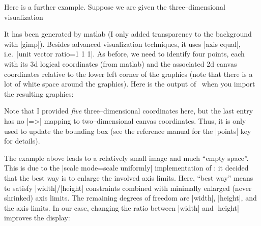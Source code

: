 {{Here is a further example. Suppose we are given the three--dimensional visualization

{\setlength{\fboxsep}{0pt}%
\centering
{}%

}%

It has been generated by matlab (I only added transparency to the background with |gimp|). Besides advanced visualization techniques, it uses |axis equal|, i.e.\ |unit vector ratio=1 1 1|. As before, we need to identify four points, each with its 3d logical coordinates (from matlab) and the associated 2d canvas coordinates relative to the lower left corner of the graphics (note that there is a lot of white space around the graphics). Here is the output of \PGFPlots\ when you import the resulting graphics:

\begin{codeexample}[]
\end{codeexample}
\noindent Note that I provided \emph{five} three--dimensional coordinates here, but the last entry has no |=>| mapping to two--dimensional canvas coordinates. Thus, it is only used to update the bounding box (see the reference manual for the |points| key for details).

The example above leads to a relatively small image and much ``empty space''. This is due to the |scale mode=scale uniformly| implementation of \PGFPlots: it decided that the best way is to enlarge the involved axis limits. Here, ``best way'' means to satisfy |width|/|height| constraints combined with minimally enlarged (never shrinked) axis limits. The remaining degrees of freedom are |width|, |height|, and the axis limits. In our case, changing the ratio between |width| and |height| improves the display:

}}
